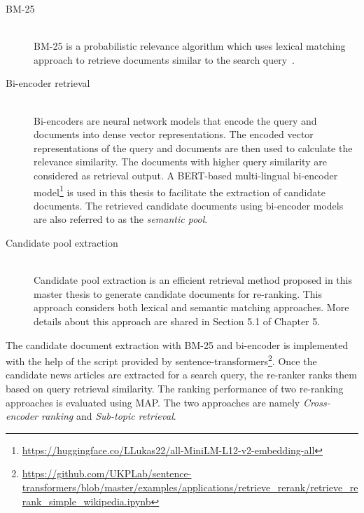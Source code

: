 \begin{description}
	\item[BM-25]  \hfill \\ BM-25 is a probabilistic relevance algorithm which uses lexical matching approach to retrieve documents similar to the search query~\cite{amati_bm25_2009}.
	
	\item[Bi-encoder retrieval]  \hfill \\ Bi-encoders are neural network models that encode the query and documents into dense vector representations. The encoded vector representations of the query and documents are then used to calculate the relevance similarity. The documents with higher query similarity are considered as retrieval output. A BERT-based multi-lingual bi-encoder model\footnote{\url{https://huggingface.co/LLukas22/all-MiniLM-L12-v2-embedding-all}} is used in this thesis to facilitate the extraction of candidate documents. The retrieved candidate documents using bi-encoder models are also referred to as the \emph{semantic pool}.
	
	
	\item[Candidate pool extraction]  \hfill \\ Candidate pool extraction is an efficient retrieval method proposed in this master thesis to generate candidate documents for re-ranking. This approach considers both lexical and semantic matching approaches. More details about this approach are shared in Section 5.1 of Chapter 5.
	
\end{description}

The candidate document extraction with BM-25 and bi-encoder is implemented with the help of the script provided by sentence-transformers\footnote{\url{https://github.com/UKPLab/sentence-transformers/blob/master/examples/applications/retrieve_rerank/retrieve_rerank_simple_wikipedia.ipynb}}. Once the candidate news articles are extracted for a search query, the re-ranker ranks them based on query retrieval similarity. The ranking performance of two re-ranking approaches is evaluated using \ac{MAP}. The two approaches are namely \emph{Cross-encoder ranking} and \emph{Sub-topic retrieval}.



